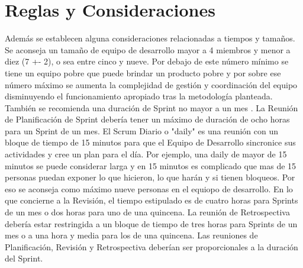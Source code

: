 \section{Reglas y Consideraciones}

Además se establecen alguna consideraciones relacionadas a tiempos y tamaños. Se aconseja un tamaño de equipo de desarrollo mayor a 4 miembros y menor a diez (7 +- 2), o sea entre cinco y nueve. Por debajo de este número mínimo se tiene un equipo pobre que puede brindar un producto pobre y por sobre ese número máximo se aumenta la complejidad de gestión y coordinación del equipo disminuyendo el funcionamiento apropiado tras la metodología planteada. También se recomienda una duración de Sprint no mayor a un mes \cite{Ken-Jeff-2013}. La Reunión de Planificación de Sprint debería tener un máximo de duración de ocho horas para un Sprint de un mes. El Scrum Diario o "daily" es una reunión con un bloque de tiempo de 15 minutos para que el Equipo de Desarrollo sincronice sus actividades y cree un plan para el día. Por ejemplo, una daily de mayor de 15 minutos se puede considerar larga y en 15 minutos es complicado que mas de 15 personas puedan exponer lo que hicieron, lo que harán y si tienen bloqueos. Por eso se aconseja como máximo nueve personas en el equiopo de desarrollo. En lo que concierne a la Revisión, el tiempo estipulado es de cuatro horas para Sprints de un mes o dos horas para uno de una quincena. La reunión de Retrospectiva  debería estar restringida a un bloque de tiempo de tres horas para Sprints de un mes o  a una hora y media para los de una quincena. Las reuniones de Planificación, Revisión y Retrospectiva deberían ser proporcionales a la duración del Sprint.
